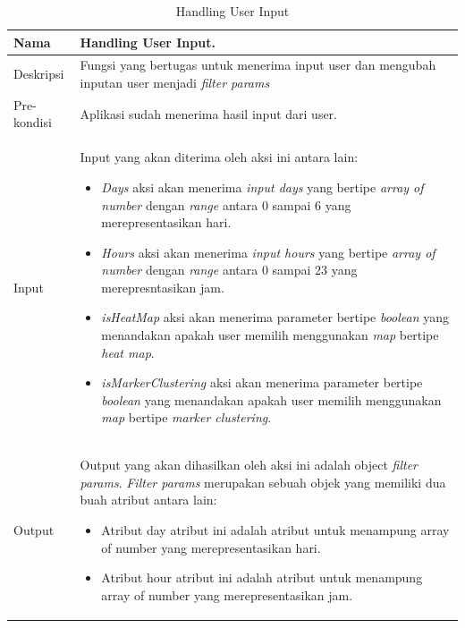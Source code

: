 \begin{table}[H]
    \centering
       \caption{Handling User Input}
    \begin{tabular}{|p{3cm}|p{10cm}|}
    \hline
        Nama & Handling User Input.\\
    \hline
    \hline
        Deskripsi & Fungsi yang bertugas untuk menerima input user dan mengubah inputan user menjadi \textit{filter params}  \\
    \hline
        Pre-kondisi & Aplikasi sudah menerima hasil input dari user.\\
    \hline
        Input & 
        Input yang akan diterima oleh aksi ini antara lain:
        \begin{itemize}
            \item \textit{Days} aksi akan menerima \textit{input days} yang bertipe \textit{array of number} dengan \textit{range} antara 0 sampai 6 yang merepresentasikan hari.
            \item \textit{Hours} aksi akan menerima \textit{input hours} yang bertipe \textit{array of number} dengan \textit{range} antara 0 sampai 23 yang merepresntasikan jam.
            \item \textit{isHeatMap} aksi akan menerima parameter bertipe \textit{boolean} yang menandakan apakah user memilih menggunakan \textit{map} bertipe \textit{heat map}.
            \item \textit{isMarkerClustering} aksi akan menerima parameter bertipe \textit{boolean} yang menandakan apakah user memilih menggunakan \textit{map} bertipe \textit{marker clustering}.
        \end{itemize}
       \\
       \hline
        Output & 
        Output yang akan dihasilkan oleh aksi ini adalah object \textit{filter params}. \textit{Filter params} merupakan sebuah objek yang memiliki dua buah atribut antara lain: 
        \begin{itemize}
            \item Atribut day atribut ini adalah atribut untuk menampung array of number yang merepresentasikan hari.
            \item Atribut hour atribut ini adalah atribut untuk menampung array of number yang merepresentasikan jam.
        \end{itemize}
       \\
    \hline
    \end{tabular}
\end{table}

